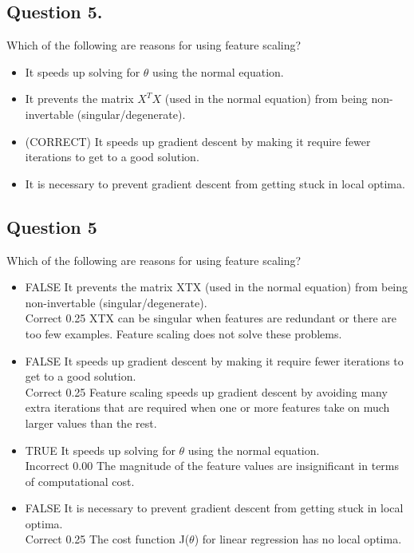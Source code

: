 \documentclass[11pt]{article} %
\begin{document}
	\subsection{Question 5.} 
	Which of the following are reasons for using feature scaling?
	
	\begin{itemize}
		\item It speeds up solving for $\theta$ using the normal equation.
		\item It prevents the matrix $X^TX$ (used in the normal equation) from being non-invertable (singular/degenerate).
		\item (CORRECT) It speeds up gradient descent by making it require fewer iterations to get to a good solution.
		\item It is necessary to prevent gradient descent from getting stuck in local optima.
	\end{itemize}
	\newpage


	\subsection*{Question 5}
	Which of the following are reasons for using feature scaling?
	
	\begin{itemize}
		\item FALSE It prevents the matrix XTX (used in the normal equation) from being non-invertable (singular/degenerate).	
		\\Correct	0.25	 XTX can be singular when features are redundant or there are too few examples. Feature scaling does not solve these problems.
		\item  FALSE It speeds up gradient descent by making it require fewer iterations to get to a good solution.	
		\\Correct	0.25	 Feature scaling speeds up gradient descent by avoiding many extra iterations that are required when one or more features take on much larger values than the rest.
		\item  TRUE It speeds up solving for $\theta$ using the normal equation.	
		\\Incorrect	0.00	 The magnitude of the feature values are insignificant in terms of computational cost.
		\item  FALSE It is necessary to prevent gradient descent from getting stuck in local optima.	
		\\Correct	0.25	 The cost function J($\theta$) for linear regression has no local optima.
	\end{itemize}
\end{document}
